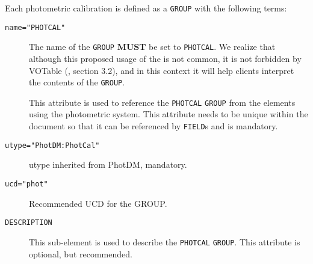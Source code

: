 \documentclass[11pt,a4paper]{ivoa} 
\newcommand\ada[1]{\textcolor{blue}{\textbf{#1}}}
\let\fg=\color
\def\elem#1{{\tt{\fg{DarkRed}#1}}}
\def\attrval#1#2{{\tt{\fg{DarkRed}#1}="{\fg{DarkPurple}#2}"}}
\begin{document}
Each photometric calibration is defined as a \elem{GROUP} with the
following terms:
\begin{description}
     \item[\attrval{name}{PHOTCAL}] The name of the \elem{GROUP}
       \textbf{MUST} be set to \verb|PHOTCAL|. We realize that
       although this proposed usage of the  is not common,
       it is not forbidden by VOTable (\citet{2019ivoa.spec.1021O},
       section 3.2), and in this context it will help clients
       interpret the contents of the \elem{GROUP}.
     \item[] This attribute is used to reference the
       \texttt{PHOTCAL} \elem{GROUP} from the elements using the
       photometric system. This attribute needs to be unique within
       the document so that it can be referenced by \elem{FIELD}s and
       is mandatory.
     \item[\attrval{utype}{PhotDM:PhotCal}] utype inherited from PhotDM,
       mandatory.
     \item[\attrval{ucd}{phot}] Recommended UCD for the GROUP.
     \item[\elem{DESCRIPTION}] This sub-element is used to describe the
       \texttt{PHOTCAL} \elem{GROUP}. This attribute is optional, but
       recommended.
\end{description}
\end{document}
